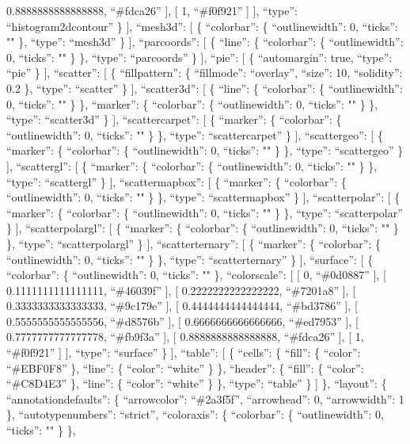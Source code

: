 \documentclass[
]{article}
\begin{document}
0.8888888888888888, ``\#fdca26'' {]}, {[} 1, ``\#f0f921'' {]} {]},
``type'': ``histogram2dcontour'' \} {]}, ``mesh3d'': {[} \{
``colorbar'': \{ ``outlinewidth'': 0, ``ticks'': "" \}, ``type'':
``mesh3d'' \} {]}, ``parcoords'': {[} \{ ``line'': \{ ``colorbar'': \{
``outlinewidth'': 0, ``ticks'': "" \} \}, ``type'': ``parcoords'' \}
{]}, ``pie'': {[} \{ ``automargin'': true, ``type'': ``pie'' \} {]},
``scatter'': {[} \{ ``fillpattern'': \{ ``fillmode'': ``overlay'',
``size'': 10, ``solidity'': 0.2 \}, ``type'': ``scatter'' \} {]},
``scatter3d'': {[} \{ ``line'': \{ ``colorbar'': \{ ``outlinewidth'': 0,
``ticks'': "" \} \}, ``marker'': \{ ``colorbar'': \{ ``outlinewidth'':
0, ``ticks'': "" \} \}, ``type'': ``scatter3d'' \} {]},
``scattercarpet'': {[} \{ ``marker'': \{ ``colorbar'': \{
``outlinewidth'': 0, ``ticks'': "" \} \}, ``type'': ``scattercarpet'' \}
{]}, ``scattergeo'': {[} \{ ``marker'': \{ ``colorbar'': \{
``outlinewidth'': 0, ``ticks'': "" \} \}, ``type'': ``scattergeo'' \}
{]}, ``scattergl'': {[} \{ ``marker'': \{ ``colorbar'': \{
``outlinewidth'': 0, ``ticks'': "" \} \}, ``type'': ``scattergl'' \}
{]}, ``scattermapbox'': {[} \{ ``marker'': \{ ``colorbar'': \{
``outlinewidth'': 0, ``ticks'': "" \} \}, ``type'': ``scattermapbox'' \}
{]}, ``scatterpolar'': {[} \{ ``marker'': \{ ``colorbar'': \{
``outlinewidth'': 0, ``ticks'': "" \} \}, ``type'': ``scatterpolar'' \}
{]}, ``scatterpolargl'': {[} \{ ``marker'': \{ ``colorbar'': \{
``outlinewidth'': 0, ``ticks'': "" \} \}, ``type'': ``scatterpolargl''
\} {]}, ``scatterternary'': {[} \{ ``marker'': \{ ``colorbar'': \{
``outlinewidth'': 0, ``ticks'': "" \} \}, ``type'': ``scatterternary''
\} {]}, ``surface'': {[} \{ ``colorbar'': \{ ``outlinewidth'': 0,
``ticks'': "" \}, ``colorscale'': {[} {[} 0, ``\#0d0887'' {]}, {[}
0.1111111111111111, ``\#46039f'' {]}, {[} 0.2222222222222222,
``\#7201a8'' {]}, {[} 0.3333333333333333, ``\#9c179e'' {]}, {[}
0.4444444444444444, ``\#bd3786'' {]}, {[} 0.5555555555555556,
``\#d8576b'' {]}, {[} 0.6666666666666666, ``\#ed7953'' {]}, {[}
0.7777777777777778, ``\#fb9f3a'' {]}, {[} 0.8888888888888888,
``\#fdca26'' {]}, {[} 1, ``\#f0f921'' {]} {]}, ``type'': ``surface'' \}
{]}, ``table'': {[} \{ ``cells'': \{ ``fill'': \{ ``color'':
``\#EBF0F8'' \}, ``line'': \{ ``color'': ``white'' \} \}, ``header'': \{
``fill'': \{ ``color'': ``\#C8D4E3'' \}, ``line'': \{ ``color'':
``white'' \} \}, ``type'': ``table'' \} {]} \}, ``layout'': \{
``annotationdefaults'': \{ ``arrowcolor'': ``\#2a3f5f'', ``arrowhead'':
0, ``arrowwidth'': 1 \}, ``autotypenumbers'': ``strict'', ``coloraxis'':
\{ ``colorbar'': \{ ``outlinewidth'': 0, ``ticks'': "" \} \},
\end{document}
